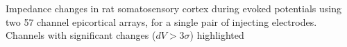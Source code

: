\label{EPDZ} Impedance changes in rat somatosensory cortex during evoked potentials using two 57 channel epicortical arrays, for a single pair of injecting electrodes.  Channels with significant changes ($dV > 3\sigma$) highlighted